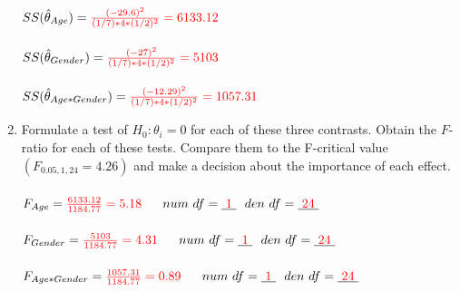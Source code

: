 \begin{enumerate}
$SS(\hat{\theta}_{Age}) = \textcolor{red}{\frac{(-29.6)^2}{(1/7)*4*(1/2)^2}=6133.12}$\\~\\
$SS(\hat{\theta}_{Gender}) = \textcolor{red}{\frac{(-27)^2}{(1/7)*4*(1/2)^2}=5103}$\\~\\
$SS(\hat{\theta}_{Age*Gender}) = \textcolor{red}{\frac{(-12.29)^2}{(1/7)*4*(1/2)^2}=1057.31}$

\newpage

\item Formulate a test of $H_0:\theta_i=0$ for each of these three contrasts.  Obtain the $F$-ratio for each of these tests. Compare them to the F-critical value $(F_{0.05,1,24}=4.26)$ and make a decision about the importance of each effect.
\\~\\
$F_{Age}=\textcolor{red}{\frac{6133.12}{1184.77}=5.18}~~~~~num~df=\underbar{~\textcolor{red}{1}~}~~den~df=\underbar{~\textcolor{red}{24}~}$\\~\\
$F_{Gender}=\textcolor{red}{\frac{5103}{1184.77}=4.31}~~~~~num~df=\underbar{~\textcolor{red}{1}~}~~den~df=\underbar{~\textcolor{red}{24}~}$\\~\\
$F_{Age*Gender}=\textcolor{red}{\frac{1057.31}{1184.77}=0.89}~~~~~num~df=\underbar{~\textcolor{red}{1}~}~~den~df=\underbar{~\textcolor{red}{24}~}$\\~\\

\end{enumerate}
